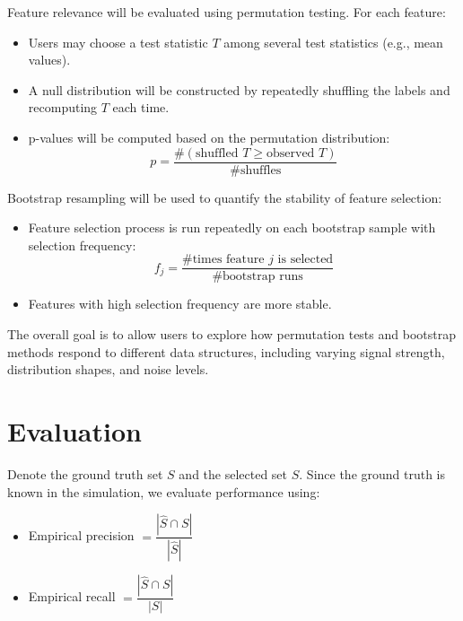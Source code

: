 \documentclass{article}
\begin{document}
Feature relevance will be evaluated using permutation testing. For each feature:
\begin{itemize}[itemsep=0pt, parsep=0pt, topsep=0pt]
    \item Users may choose a test statistic $T$ among several test statistics (e.g., mean values).
    \item A null distribution will be constructed by repeatedly shuffling the labels and recomputing $T$ each time.
    \item p-values will be computed based on the permutation distribution:
    \[
    p = \frac{\# (\text{shuffled }T \geq \text{observed }T)}{\#\text{shuffles}}
    \]
\end{itemize}

Bootstrap resampling will be used to quantify the stability of feature selection:
\begin{itemize}[itemsep=0pt, parsep=0pt, topsep=0pt]
    \item Feature selection process is run repeatedly on each bootstrap sample with selection frequency:
    \[
    f_j=\frac{\#\text{times feature $j$ is selected}}{\#\text{bootstrap runs}}
    \]
    \item Features with high selection frequency are more stable.
\end{itemize}

The overall goal is to allow users to explore how permutation tests and bootstrap methods respond to different data structures, including varying signal strength, distribution shapes, and noise levels.

\section{Evaluation}
Denote the ground truth set $S$ and the selected set $\hat{S}$. Since the ground truth is known in the simulation, we evaluate performance using:
\begin{itemize}[itemsep=0pt, parsep=0pt, topsep=0pt]
    \item Empirical precision $= \dfrac{|\hat{S}\cap S|}{|\hat{S}|}$
    \item Empirical recall $= \dfrac{|\hat{S}\cap S|}{|S|}$
\end{itemize}
\end{document}
